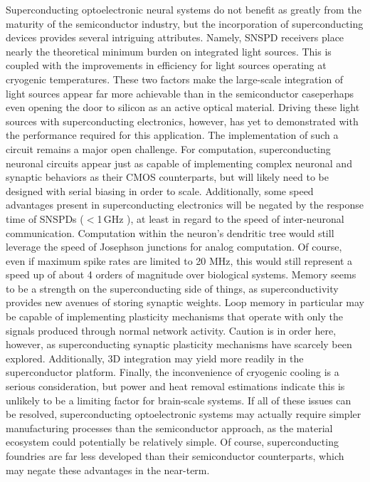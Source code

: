 \documentclass[twocolumn]{article}
\begin{document}
Superconducting optoelectronic neural systems do not benefit as greatly from the maturity of the semiconductor industry, but the incorporation of superconducting devices provides several intriguing attributes. Namely, SNSPD receivers place nearly the theoretical minimum burden on integrated light sources. This is coupled with the improvements in efficiency for light sources operating at cryogenic temperatures. These two factors make the large-scale integration of light sources appear far more achievable than in the semiconductor case\textemdash perhaps even opening the door to silicon as an active optical material. Driving these light sources with superconducting electronics, however, has yet to demonstrated with the performance required for this application. The implementation of such a circuit remains a major open challenge. For computation, superconducting neuronal circuits appear just as capable of implementing complex neuronal and synaptic behaviors as their CMOS counterparts, but will likely need to be designed with serial biasing in order to scale. Additionally, some speed advantages present in superconducting electronics will be negated by the response time of SNSPDs ($<$1\,GHz ), at least in regard to the speed of inter-neuronal communication. Computation within the neuron's dendritic tree would still leverage the speed of Josephson junctions for analog computation. Of course, even if maximum spike rates are limited to 20 MHz, this would still represent a speed up of about 4 orders of magnitude over biological systems. Memory seems to be a strength on the superconducting side of things, as superconductivity provides new avenues of storing synaptic weights. Loop memory in particular may be capable of implementing plasticity mechanisms that operate with only the signals produced through normal network activity. Caution is in order here, however, as superconducting synaptic plasticity mechanisms have scarcely been explored. Additionally, 3D integration may yield more readily in the superconductor platform. Finally, the inconvenience of cryogenic cooling is a serious consideration, but power and heat removal estimations indicate this is unlikely to be a limiting factor for brain-scale systems. If all of these issues can be resolved, superconducting optoelectronic systems may actually require simpler manufacturing processes than the semiconductor approach, as the material ecosystem could potentially be relatively simple. Of course, superconducting foundries are far less developed than their semiconductor counterparts, which may negate these advantages in the near-term.
\end{document}
